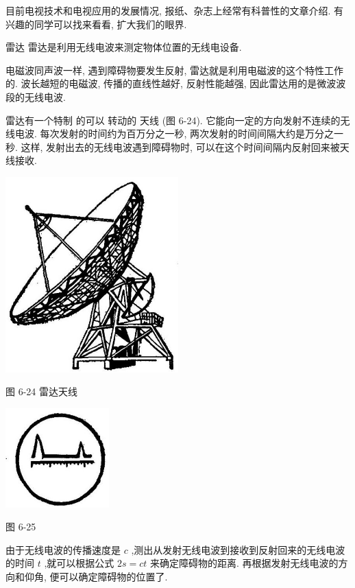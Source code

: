 \documentclass[10pt]{article}
\begin{document}
目前电视技术和电视应用的发展情况, 报纸、杂志上经常有科普性的文章介绍. 有兴趣的同学可以找来看看, 扩大我们的眼界.

雷达 雷达是利用无线电波来测定物体位置的无线电设备.

电磁波同声波一样, 遇到障碍物要发生反射, 雷达就是利用电磁波的这个特性工作的. 波长越短的电磁波, 传播的直线性越好, 反射性能越强, 因此雷达用的是微波波段的无线电波.

雷达有一个特制 的可以 转动的 天线 (图 6-24). 它能向一定的方向发射不连续的无线电波. 每次发射的时间约为百万分之一秒, 两次发射的时间间隔大约是万分之一秒. 这样, 发射出去的无线电波遇到障碍物时, 可以在这个时间间隔内反射回来被天线接收.

\begin{center}
\includegraphics[max width=0.5\textwidth]{images/01913056-1f15-74d8-9184-9aab52c9d66b_216_619951.jpg}
\end{center}

图 6-24 雷达天线

\begin{center}
\includegraphics[max width=0.3\textwidth]{images/01913056-1f15-74d8-9184-9aab52c9d66b_216_354387.jpg}
\end{center}

图 6-25

由于无线电波的传播速度是 \(c\) ,测出从发射无线电波到接收到反射回来的无线电波的时间 \(t\) ,就可以根据公式 \({2s} = {ct}\) 来确定障碍物的距离. 再根据发射无线电波的方向和仰角, 便可以确定障碍物的位置了.
\end{document}
